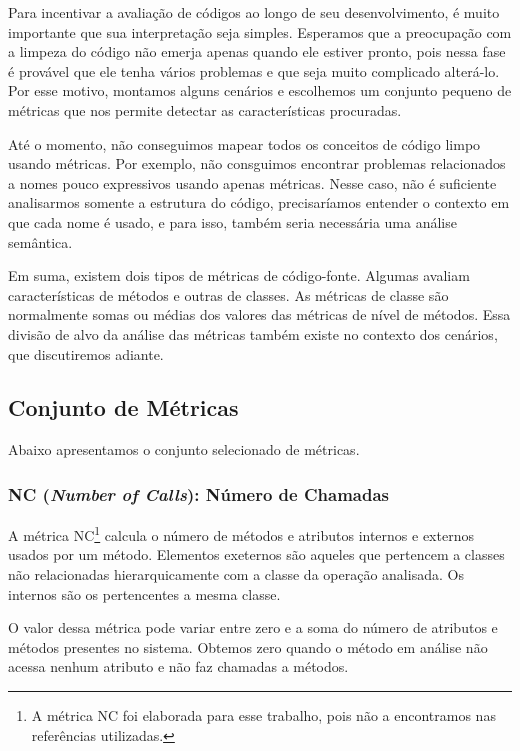 Para incentivar a avaliação de códigos ao longo de seu desenvolvimento, é muito importante que sua interpretação seja simples. Esperamos que a preocupação com a limpeza do código não emerja apenas quando ele estiver pronto, pois nessa fase é provável que ele tenha vários problemas e que seja muito complicado alterá-lo. Por esse motivo, montamos alguns cenários e escolhemos um conjunto pequeno de métricas que nos permite detectar as características procuradas.

Até o momento, não conseguimos mapear todos os conceitos de código limpo usando métricas. Por exemplo, não consguimos encontrar problemas relacionados a nomes pouco expressivos usando apenas métricas. Nesse caso, não é suficiente analisarmos somente a estrutura do código, precisaríamos entender o contexto em que cada nome é usado, e para isso, também seria necessária uma análise semântica.

Em suma, existem dois tipos de métricas de código-fonte. Algumas avaliam características de métodos e outras de classes. As métricas de classe são normalmente somas ou médias dos valores das métricas de nível de métodos. Essa divisão de alvo da análise das métricas também existe no contexto dos cenários, que discutiremos adiante.



\subsection{Conjunto de Métricas}

Abaixo apresentamos o conjunto selecionado de métricas.

\subsubsection{NC (\textit{Number of Calls}): Número de Chamadas}

A métrica NC\footnote{A métrica NC foi elaborada para esse trabalho, pois não a encontramos nas referências utilizadas.} calcula o número de métodos e atributos internos e externos usados por um método. Elementos exeternos são aqueles que pertencem a classes não relacionadas hierarquicamente com a classe da operação analisada. Os internos são os pertencentes a mesma classe.
                                                                 
O valor dessa métrica pode variar entre zero e a soma do número de atributos e métodos presentes no sistema. Obtemos zero quando o método em análise não acessa nenhum atributo e não faz chamadas a métodos.
	

